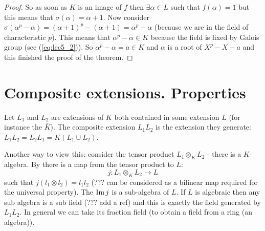 \begin{theorem}
\begin{proof}
    So as soon as $K$ is an image of $f$ then $\exists \alpha \in L$
    such that $f\left(\alpha\right) = 1$ but this means that
    $\sigma\left(\alpha\right) = \alpha + 1$. Now consider
    $\sigma\left(\alpha^p - \alpha\right) =
    \left(\alpha + 1\right)^p - \left(\alpha + 1\right) = \alpha^p -
    \alpha$ (because we are in the field of characteristic $p$). This
    means that $\alpha^p - \alpha \in K$ because the field is fixed by
    Galois group (see (\ref{eq:lec5_2})). So
    $\alpha^p - \alpha =  a \in K$ and $\alpha$ is a root of $X^p - X
    - a$ and this finished the proof of the theorem.
  \end{proof}
  \label{thm:lec7_1}
\end{theorem}

\section{Composite extensions. Properties}

\begin{definition}
  Let $L_1$ and $L_2$ are extensions of $K$ both contained in some
  extension $L$ (for instance the 
  $\bar{K}$). The composite extension $L_1 L_2$ is the extension they
  generate: $L_1 L_2 = L_2 L_1 = K\left(L_1 \cup L_2\right)$.
  \label{def:compositeextension}
\end{definition}

Another way to view this: consider the tensor product $L_1 \otimes_K
L_2$ - there is a $K$-algebra. By 
there is a map from the tensor product to $L$:
\[
j: L_1 \otimes_K L_2 \to L  
\]
such that $j\left(l_1 \otimes l_2\right) = l_1 l_2$ (??? can be considered
as a bilinear map required for the universal property). The
 $\operatorname{Im} j$ is a sub-algebra of $L$. If $L$ is
algebraic then any sub algebra is a sub field (??? add a ref) and this
is exactly the field generated by $L_1 L_2$. In general we can take
its fraction field (to obtain a field from a ring (an algebra)).

